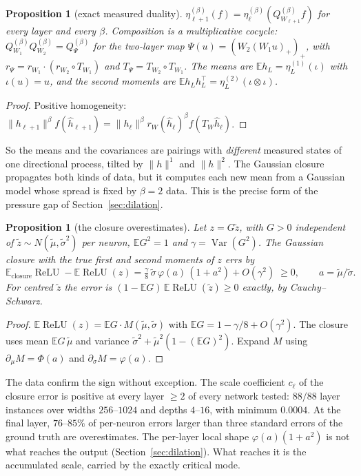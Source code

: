 \documentclass[11pt]{article}
\newtheorem{proposition}[theorem]{Proposition}
\theoremstyle{definition}
\theoremstyle{remark}
\newcommand{\E}{\mathbb E}
\newcommand{\Var}{\operatorname{Var}}
\newcommand{\relu}{\operatorname{ReLU}}
\begin{document}
\begin{proposition}[exact measured duality]\label{prop:measured}
$\eta^{(\beta)}_{\ell+1}(f)=\eta^{(\beta)}_\ell(Q^{(\beta)}_{W_{\ell+1}}f)$ for every layer and every $\beta$. Composition is a multiplicative cocycle: $Q^{(\beta)}_{W_1}Q^{(\beta)}_{W_2}=Q^{(\beta)}_\Psi$ for the two-layer map $\Psi(u)=(W_2(W_1u)_+)_+$, with $r_\Psi=r_{W_1}\cdot(r_{W_2}\circ T_{W_1})$ and $T_\Psi=T_{W_2}\circ T_{W_1}$. The means are $\E h_L=\eta^{(1)}_L(\iota)$ with $\iota(u)=u$, and the second moments are $\E h_Lh_L^\top=\eta^{(2)}_L(\iota\otimes\iota)$.
\end{proposition}

\begin{proof}
Positive homogeneity: $\|h_{\ell+1}\|^\beta f(\hat h_{\ell+1})=\|h_\ell\|^\beta r_W(\hat h_\ell)^\beta f(T_W\hat h_\ell)$.
\end{proof}

\noindent So the means and the covariances are pairings with \emph{different} measured states of one directional process, tilted by $\|h\|^1$ and $\|h\|^2$. The Gaussian closure propagates both kinds of data, but it computes each new mean from a Gaussian model whose spread is fixed by $\beta=2$ data. This is the precise form of the pressure gap of Section~\ref{sec:dilation}.

\begin{proposition}[the closure overestimates]\label{prop:sign}
Let $z=G\tilde z$, with $G>0$ independent of $\tilde z\sim N(\tilde\mu,\tilde\sigma^2)$ per neuron, $\E G^2=1$ and $\gamma=\Var(G^2)$. The Gaussian closure with the true first and second moments of $z$ errs by
\[
\E_{\mathrm{closure}}\relu-\E\relu(z)=\tfrac{\gamma}{8}\,\tilde\sigma\,\varphi(a)\,(1+a^2)+O(\gamma^2)\;\ge0,\qquad a=\tilde\mu/\tilde\sigma .
\]
For centred $\tilde z$ the error is $(1-\E G)\,\E\relu(\tilde z)\ge0$ exactly, by Cauchy--Schwarz.
\end{proposition}

\begin{proof}
$\E\relu(z)=\E G\cdot M(\tilde\mu,\tilde\sigma)$ with $\E G=1-\gamma/8+O(\gamma^2)$. The closure uses mean $\E G\,\tilde\mu$ and variance $\tilde\sigma^2+\tilde\mu^2(1-(\E G)^2)$. Expand $M$ using $\partial_\mu M=\Phi(a)$ and $\partial_\sigma M=\varphi(a)$.
\end{proof}

\noindent The data confirm the sign without exception. The scale coefficient $c_\ell$ of the closure error is positive at every layer $\ge2$ of every network tested: $88/88$ layer instances over widths $256$--$1024$ and depths $4$--$16$, with minimum $0.0004$. At the final layer, $76$--$85\%$ of per-neuron errors larger than three standard errors of the ground truth are overestimates. The per-layer local shape $\varphi(a)(1+a^2)$ is not what reaches the output (Section~\ref{sec:dilation}). What reaches it is the accumulated scale, carried by the exactly critical mode.
\end{document}
